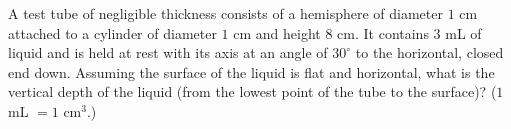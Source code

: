 A test tube of negligible thickness consists of a hemisphere of diameter $1$ cm attached to a cylinder of diameter $1$ cm and height $8$ cm. It contains $3$ mL of liquid and is held at rest with its axis at an angle of $30^\circ$ to the horizontal, closed end down. Assuming the surface of the liquid is flat and horizontal, what is the vertical depth of the liquid (from the lowest point of the tube to the surface)? ($1$ mL $=1$ cm$^3$.)
